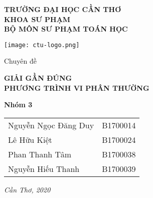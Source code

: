 \thispagestyle{empty}
\begin{center}\large
	\textbf{TRƯỜNG ĐẠI HỌC CẦN THƠ}\\
	\textbf{KHOA SƯ PHẠM}\\
	\textbf{BỘ MÔN SƯ PHẠM TOÁN HỌC}
\end{center}
\vfill
{\centering\texttt{[image: ctu-logo.png]}\par}
\vfill
\begin{center}
	{\LARGE Chuyên đề}\par
	{\Huge\bfseries GIẢI GẦN ĐÚNG}\\
	{\LARGE\bfseries PHƯƠNG TRÌNH VI PHÂN THƯỜNG}
\end{center}
\vfill
\begin{center}\large
	\textbf{Nhóm 3}\par
	\begin{tabular}{ll}
		Nguyễn Ngọc Đăng Duy& B1700014\\
		Lê Hữu Kiệt&B1700024\\
		Phan Thanh Tâm& B1700038\\
		Nguyễn Hiếu Thanh& B1700039
	\end{tabular}
\end{center}
\vfill
{\centering\large\textit{Cần Thơ, 2020}\par}
\newpage